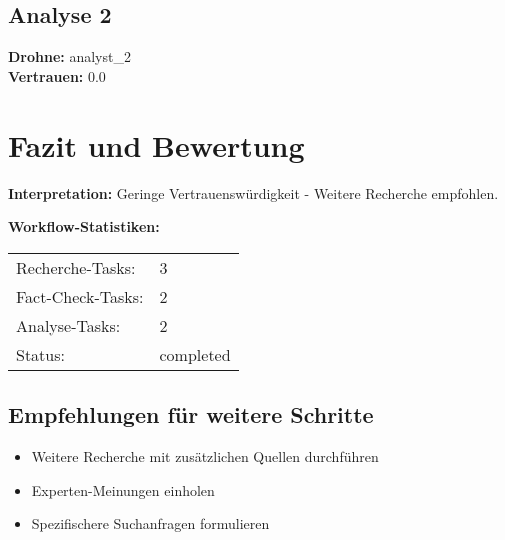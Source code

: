 \documentclass[12pt,a4paper]{article}
\begin{document}
\subsection{Analyse 2}

\textbf{Drohne:} analyst\_2\\
\textbf{Vertrauen:} 0.0%


\newpage
\section{Fazit und Bewertung}


\textbf{Interpretation:} Geringe Vertrauenswürdigkeit - Weitere Recherche empfohlen.

\textbf{Workflow-Statistiken:}
\begin{tabular}{ll}
Recherche-Tasks: & 3 \\
Fact-Check-Tasks: & 2 \\
Analyse-Tasks: & 2 \\
Status: & completed \\
\end{tabular}

\subsection{Empfehlungen für weitere Schritte}

\begin{itemize}
\item Weitere Recherche mit zusätzlichen Quellen durchführen
\item Experten-Meinungen einholen
\item Spezifischere Suchanfragen formulieren
\end{itemize}
\end{document}
